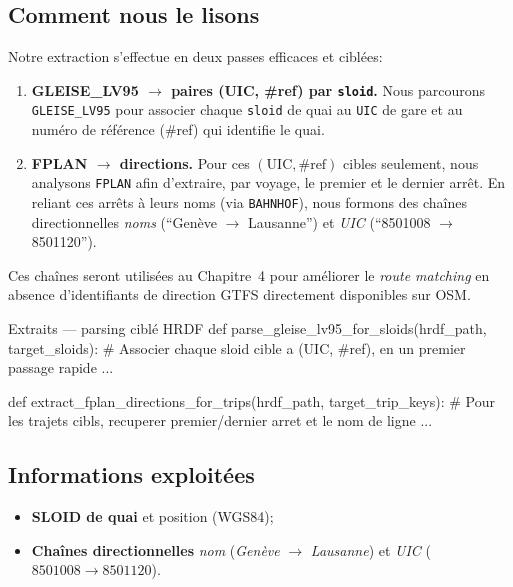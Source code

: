 \subsection{Comment nous le lisons}
Notre extraction s’effectue en deux passes efficaces et ciblées:
\begin{enumerate}
  \item \textbf{GLEISE\_LV95 \(\to\) paires (UIC, \#ref) par \texttt{sloid}.} Nous parcourons \texttt{GLEISE\_LV95} pour associer chaque \texttt{sloid} de quai au \texttt{UIC} de gare et au numéro de référence (\#ref) qui identifie le quai.
  \item \textbf{FPLAN \(\to\) directions.} Pour ces \((\text{UIC}, \#\text{ref})\) cibles seulement, nous analysons \texttt{FPLAN} afin d’extraire, par voyage, le premier et le dernier arrêt. En reliant ces arrêts à leurs noms (via \texttt{BAHNHOF}), nous formons des chaînes directionnelles \textit{noms} (\enquote{Genève \(\to\) Lausanne}) et \textit{UIC} (\enquote{8501008 \(\to\) 8501120}).
\end{enumerate}

\noindent Ces chaînes seront utilisées au Chapitre~4 pour améliorer le \textit{route matching} en absence d’identifiants de direction GTFS directement disponibles sur OSM.

\begin{codebox}[language=Python]{Extraits — parsing ciblé HRDF}
def parse_gleise_lv95_for_sloids(hrdf_path, target_sloids):
    # Associer chaque sloid cible a (UIC, #ref), en un premier passage rapide
    ...

def extract_fplan_directions_for_trips(hrdf_path, target_trip_keys):
    # Pour les trajets cibls, recuperer premier/dernier arret et le nom de ligne
    ...
\end{codebox}

\subsection{Informations exploitées}
\begin{itemize}
  \item \textbf{SLOID de quai} et position (WGS84);
  \item \textbf{Chaînes directionnelles} \textit{nom} (\textit{Genève} \(\to\) \textit{Lausanne}) et \textit{UIC} (\(8501008 \to 8501120\)).
\end{itemize}

